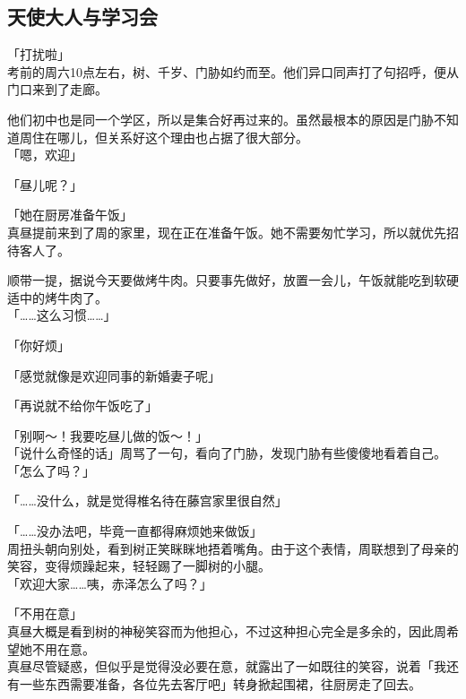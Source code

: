 \subsection{天使大人与学习会}

「打扰啦」\\

考前的周六10点左右，树、千岁、门胁如约而至。他们异口同声打了句招呼，便从门口来到了走廊。

他们初中也是同一个学区，所以是集合好再过来的。虽然最根本的原因是门胁不知道周住在哪儿，但关系好这个理由也占据了很大部分。\\

「嗯，欢迎」

「昼儿呢？」

「她在厨房准备午饭」\\

真昼提前来到了周的家里，现在正在准备午饭。她不需要匆忙学习，所以就优先招待客人了。

顺带一提，据说今天要做烤牛肉。只要事先做好，放置一会儿，午饭就能吃到软硬适中的烤牛肉了。\\

「……这么习惯……」

「你好烦」

「感觉就像是欢迎同事的新婚妻子呢」

「再说就不给你午饭吃了」

「别啊～！我要吃昼儿做的饭～！」\\

「说什么奇怪的话」周骂了一句，看向了门胁，发现门胁有些傻傻地看着自己。\\

「怎么了吗？」

「……没什么，就是觉得椎名待在藤宫家里很自然」

「……没办法吧，毕竟一直都得麻烦她来做饭」\\

周扭头朝向别处，看到树正笑眯眯地捂着嘴角。由于这个表情，周联想到了母亲的笑容，变得烦躁起来，轻轻踢了一脚树的小腿。\\

「欢迎大家……咦，赤泽怎么了吗？」

「不用在意」\\

真昼大概是看到树的神秘笑容而为他担心，不过这种担心完全是多余的，因此周希望她不用在意。\\

真昼尽管疑惑，但似乎是觉得没必要在意，就露出了一如既往的笑容，说着「我还有一些东西需要准备，各位先去客厅吧」转身掀起围裙，往厨房走了回去。

